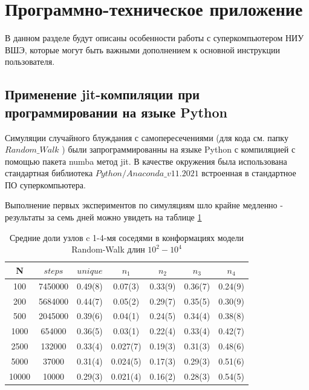 \section{Программно-техническое приложение}

В данном разделе будут описаны особенности работы с суперкомпьютером НИУ ВШЭ, которые могут быть важными дополнением к основной инструкции пользователя.

\subsection{Применение jit-компиляции при программировании на языке Python}
\label{subsection:njit_problem}

Симуляции случайного блуждания с самопересечениями (для кода см. папку $Random\_Walk$  \cite{web:ProjectMagnetRepos}) были запрограммированны на языке Python с компиляцией с помощью пакета numba метод jit. В качестве окружения была использована стандартная библиотека $Python/Anaconda\_v11.2021$ встроенная в стандартное ПО суперкомпьютера. 

Выполнение первых экспериментов по симуляциям шло крайне медленно - результаты за семь дней можно увидеть на таблице \ref{tab:Ran_Walk_neigh_1}

\begin{table}[h]
    \centering
    \begin{tabular}{|c|c|c|c|c|c|c|}
        \hline
        N & $steps$ & $unique$ & $n_{1}$ & $n_{2}$ & $n_{3}$ & $n_{4}$ \\ \hline
        100 & 7450000 & 0.49(8) & 0.07(3) & 0.33(9) & 0.36(7) & 0.24(9) \\ \hline
        200 & 5684000 & 0.44(7) & 0.05(2) & 0.29(7) & 0.35(5) & 0.30(9) \\ \hline
        500 & 2045000 & 0.39(6) & 0.04(1) & 0.24(5) & 0.34(4) & 0.38(8) \\ \hline
        1000 & 654000 & 0.36(5) & 0.03(1) & 0.22(4) & 0.33(4) & 0.42(7) \\ \hline
        2500 & 132000 & 0.33(4) & 0.027(7) & 0.19(3) & 0.31(3) & 0.48(6)  \\ \hline
        5000 & 37000 & 0.31(4) & 0.024(5) & 0.17(3) & 0.29(3) & 0.51(6) \\ \hline
        10000 & 10000 & 0.29(3) & 0.021(4) & 0.16(2) & 0.28(3) & 0.54(5) \\ \hline
    \end{tabular}
    \caption{Средние доли узлов c 1-4-мя соседями в конформациях модели Random-Walk длин $10^{2}-10^{4}$}
    \label{tab:Ran_Walk_neigh_1}
\end{table}

